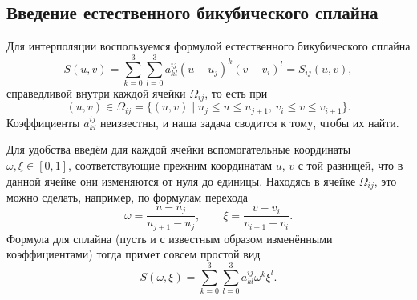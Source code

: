 \documentclass[12pt]{article}
\begin{document}
\subsection*{Введение естественного бикубического сплайна}
Для интерполяции воспользуемся формулой естественного бикубического сплайна 
\[
  S(u, v) = \sum_{k=0}^3\sum_{l=0}^3 a^{ij}_{kl} (u-u_j)^k(v - v_i)^l =
  S_{ij}(u, v),
\]
справедливой внутри каждой ячейки $ \Omega_{ij} $, то есть при 
\[
  (u, v) \in \Omega_{ij} = \{(u,v) \mid u_j \leqslant u \leqslant u_{j+1}, \,
    v_i \leqslant
  v \leqslant v_{i+1}\}.
\]
Коэффициенты $ a^{ij}_{kl} $ неизвестны, и наша задача сводится к тому, чтобы их
найти.

Для удобства введём для каждой ячейки вспомогательные координаты $ \omega, \xi
\in [0, 1]$,
соответствующие прежним координатам $ u $, $ v $ с той разницей, что в данной
ячейке они изменяются от нуля до единицы. Находясь в ячейке $ \Omega_{ij} $, это можно сделать, например, по
формулам перехода
\[
  \omega = \frac{u - u_j}{u_{j+1} - u_j}, \qquad \xi = \frac{v - v_i}{v_{i+1} -
  v_i}.
\]
Формула для сплайна (пусть и с известным образом изменёнными коэффициентами)
тогда примет совсем простой вид
\[
  S(\omega, \xi) = \sum_{k=0}^3\sum_{l=0}^3 a^{ij}_{kl} \omega^k\xi^l.
\]

\end{document}

